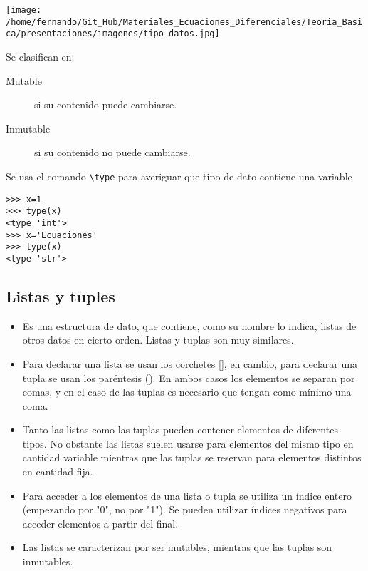 \documentclass{article}
\begin{document}
\texttt{[image: /home/fernando/Git\_Hub/Materiales\_Ecuaciones\_Diferenciales/Teoria\_Basica/presentaciones/imagenes/tipo\_datos.jpg]}

Se clasifican en:
\begin{description}
 \item[Mutable] si su contenido puede cambiarse.
 \item[Inmutable] si su contenido no puede cambiarse.
\end{description}

Se usa el comando \verb~\type~ para averiguar que tipo de dato contiene una variable

 \begin{lstlisting}
>>> x=1
>>> type(x)
<type 'int'>
>>> x='Ecuaciones'
>>> type(x)
<type 'str'>
\end{lstlisting}





\subsection{Listas y tuples}


\begin{itemize}

\item Es una estructura de dato, que contiene, como su nombre lo indica, listas de otros datos en cierto orden. Listas y tuplas son muy similares.

\item Para declarar una lista se usan los corchetes [], en cambio, para declarar una tupla se usan los paréntesis (). En ambos casos los elementos se separan por comas, y en el caso de las tuplas es necesario que tengan como mínimo una coma.

\item    Tanto las listas como las tuplas pueden contener elementos de diferentes tipos. No obstante las listas suelen usarse para elementos del mismo tipo en cantidad variable mientras que las tuplas se reservan para elementos distintos en cantidad fija.
    
\item Para acceder a los elementos de una lista o tupla se utiliza un índice entero (empezando por "0", no por "1"). Se pueden utilizar índices negativos para acceder elementos a partir del final.


\item Las listas se caracterizan por ser mutables, mientras que las tuplas son inmutables.

\end{itemize}
\end{document}

